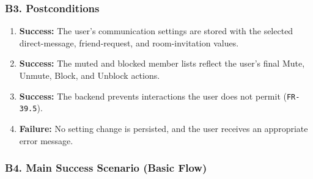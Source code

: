 \documentclass[12pt]{article}
\begin{document}
\subsubsection*{B3. Postconditions}
\par\medskip

\begin{enumerate}
\item \textbf{Success:} The user's communication settings are stored with the selected direct-message, friend-request, and room-invitation values.
\item \textbf{Success:} The muted and blocked member lists reflect the user's final Mute, Unmute, Block, and Unblock actions.
\item \textbf{Success:} The backend prevents interactions the user does not permit (\texttt{FR-39.5}).
\item \textbf{Failure:} No setting change is persisted, and the user receives an appropriate error message.
\end{enumerate}
\par\medskip

\hypertarget{sec:b4-main-success-scenario-basic-flow}{}
\subsubsection*{B4. Main Success Scenario (Basic Flow)}
\par\medskip
\end{document}
